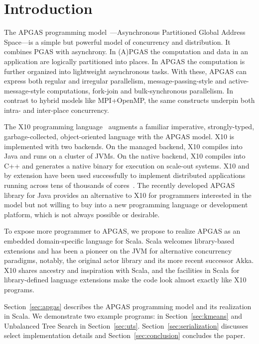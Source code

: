 \section{Introduction}

The APGAS programming model~\cite{amp10}---Asynchronous Partitioned Global Address Space---is a simple but powerful
model of concurrency and distribution. It combines PGAS with asynchrony.
In (A)PGAS the computation and data in an application are logically partitioned into places.
In APGAS the computation is further organized into lightweight asynchronous tasks.
With these, APGAS can express both
regular and irregular parallelism, message-passing-style and
active-message-style computations, fork-join and bulk-synchronous
parallelism.  In contrast to hybrid models like MPI+OpenMP, the same
constructs underpin both intra- and inter-place concurrency.

The X10 programming language~\cite{oopsla05} augments a familiar imperative, strongly-typed, garbage-collected, object-oriented language with the APGAS model. X10 is implemented with two backends. On the managed backend, X10
compiles into Java and runs on a cluster of JVMs. On the native backend, X10 compiles into C++ and generates a native binary
for execution on scale-out systems.
X10 and by extension
\apgas have been used successfully to implement distributed applications
running across tens of thousands of cores~\cite{TardieuETAL14X10ApgasAtPetascale}.
The recently developed APGAS library for Java \cite{APGASJava} provides an alternative to X10 for programmers interested in the \apgas model but not willing to buy into a new programming language or development platform, which is not always possible or desirable.

To expose more programmer to APGAS, we propose to realize APGAS as an embedded domain-specific language for Scala. 
Scala welcomes library-based extensions and has been a pioneer on
the JVM for alternative concurrency paradigms, notably, the original actor
library and its more recent successor Akka.
X10 shares ancestry and inspiration with Scala, and the
facilities in Scala for library-defined language extensions make the code look
almost exactly like X10 programs.

Section~\ref{sec:apgas} describes the APGAS programming model and its realization in Scala. We demonstrate two example programs: \kmeans in Section~\ref{sec:kmeans} and Unbalanced Tree Search in Section~\ref{sec:uts}. Section~\ref{sec:serialization} discusses select implementation details and Section~\ref{sec:conclusion} concludes the paper.



